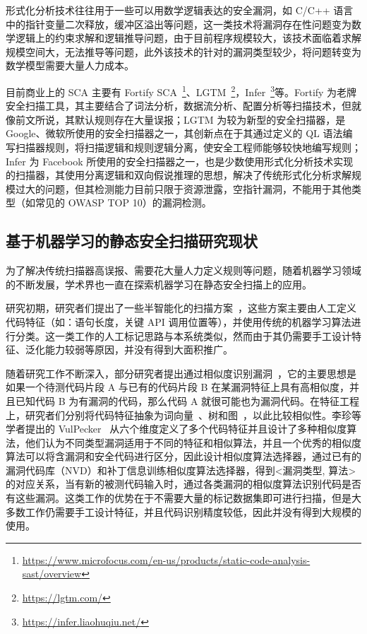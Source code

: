 形式化分析技术往往用于一些可以用数学逻辑表达的安全漏洞，如 C/C++ 语言中的指针变量二次释放，缓冲区溢出等问题，这一类技术将漏洞存在性问题变为数学逻辑上的约束求解和逻辑推导问题，由于目前程序规模较大，该技术面临着求解规模空间大，无法推导等问题，此外该技术的针对的漏洞类型较少，将问题转变为数学模型需要大量人力成本。

目前商业上的 SCA 主要有 Fortify SCA~\footnote{\url{https://www.microfocus.com/en-us/products/static-code-analysis-sast/overview}}、LGTM~\footnote{\url{https://lgtm.com/}}，Infer~\footnote{\url{https://infer.liaohuqiu.net/}}等。Fortify 为老牌安全扫描工具，其主要结合了词法分析，数据流分析、配置分析等扫描技术，但就像前文所说，其默认规则存在大量误报；LGTM 为较为新型的安全扫描器，是 Google、微软所使用的安全扫描器之一，其创新点在于其通过定义的 QL 语法编写扫描器规则，将扫描逻辑和规则逻辑分离，使安全工程师能够较快地编写规则；Infer 为 Facebook 所使用的安全扫描器之一，也是少数使用形式化分析技术实现的扫描器，其使用分离逻辑和双向假说推理的思想，解决了传统形式化分析求解规模过大的问题，但其检测能力目前只限于资源泄露，空指针漏洞，不能用于其他类型（如常见的 OWASP TOP 10）的漏洞检测。

\subsection{基于机器学习的静态安全扫描研究现状}

为了解决传统扫描器高误报、需要花大量人力定义规则等问题，随着机器学习领域的不断发展，学术界也一直在探索机器学习在静态安全扫描上的应用。

研究初期，研究者们提出了一些半智能化的扫描方案~\cite{aletheia,zranking,ayukselCaseStudy}，这些方案主要由人工定义代码特征（如：语句长度，关键 API 调用位置等），并使用传统的机器学习算法进行分类。这一类工作的人工标记思路与本系统类似，然而由于其仍需要手工设计特征、泛化能力较弱等原因，并没有得到大面积推广。

随着研究工作不断深入，部分研究者提出通过相似度识别漏洞~\cite{vuddy,li2016vulpecker}，它的主要思想是如果一个待测代码片段 A 与已有的代码片段 B 在某漏洞特征上具有高相似度，并且已知代码 B 为有漏洞的代码，那么代码 A 就很可能也为漏洞代码。在特征工程上，研究者们分别将代码特征抽象为词向量~\cite{vuddy}、树和图~\cite{simtree}，以此比较相似性。李珍等学者提出的 VulPecker~\cite{li2016vulpecker} 从六个维度定义了多个代码特征并且设计了多种相似度算法，他们认为不同类型漏洞适用于不同的特征和相似算法，并且一个优秀的相似度算法可以将含漏洞和安全代码进行区分，因此设计相似度算法选择器，通过已有的漏洞代码库（NVD）和补丁信息训练相似度算法选择器，得到<漏洞类型, 算法>的对应关系，当有新的被测代码输入时，通过各类漏洞的相似度算法识别代码是否有这些漏洞。这类工作的优势在于不需要大量的标记数据集即可进行扫描，但是大多数工作仍需要手工设计特征，并且代码识别精度较低，因此并没有得到大规模的使用。

